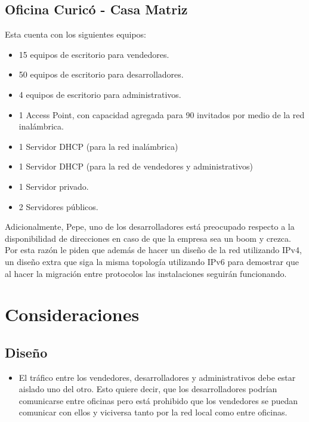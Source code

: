 \documentclass[11pt]{utalcaDoc}
\begin{document}
\subsection{Oficina Curicó - Casa Matriz}
Esta cuenta con los siguientes equipos:
\begin{itemize}
    \item{15 equipos de escritorio para vendedores.}
    \item{50 equipos de escritorio para desarrolladores.}
    \item{4 equipos de escritorio para administrativos.}
    \item{1 Access Point, con capacidad agregada para 90 invitados por medio de la red inalámbrica.}
    \item{1 Servidor DHCP (para la red inalámbrica)}
    \item{1 Servidor DHCP (para la red de vendedores y administrativos)}
    \item{1 Servidor privado.}
    \item{2 Servidores públicos.}
\end{itemize}

Adicionalmente, Pepe, uno de los desarrolladores está preocupado respecto a la disponibilidad de direcciones en caso de que la empresa sea un boom y crezca. Por esta razón le piden que además de hacer un diseño de la red utilizando IPv4, un diseño extra que siga la misma topología utilizando IPv6 para demostrar que al hacer la migración entre protocolos las instalaciones seguirán funcionando.

\section{Consideraciones}
\subsection{Diseño}
\begin{itemize}
    \item {El tráfico entre los vendedores, desarrolladores y administrativos debe estar aislado uno del otro. Esto quiere decir, que los desarrolladores podrían comunicarse entre oficinas pero está prohibido que los vendedores se puedan comunicar con ellos y viciversa tanto por la red local como entre oficinas.}
\end{itemize}
\end{document}

